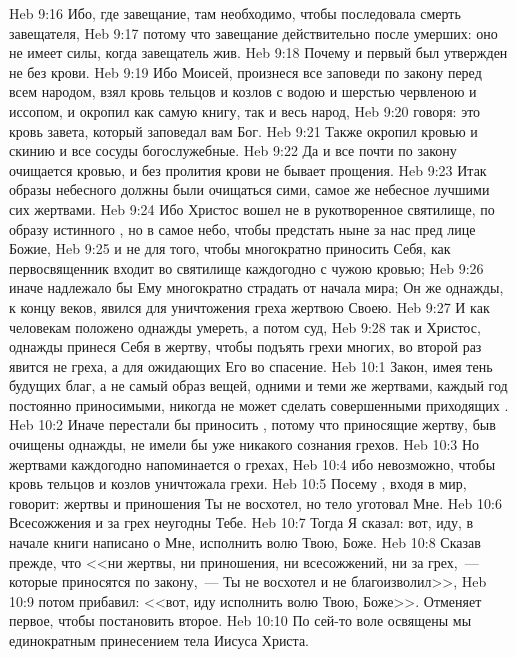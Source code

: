 \vs Heb 9:16 Ибо, где завещание, там необходимо, чтобы последовала смерть завещателя,
\vs Heb 9:17 потому что завещание действительно после умерших: оно не имеет силы, когда завещатель жив.
\vs Heb 9:18 Почему и первый  был утвержден не без крови.
\vs Heb 9:19 Ибо Моисей, произнеся все заповеди по закону перед всем народом, взял кровь тельцов и козлов с водою и шерстью червленою и иссопом, и окропил как самую книгу, так и весь народ,
\vs Heb 9:20 говоря: это кровь завета, который заповедал вам Бог.
\vs Heb 9:21 Также окропил кровью и скинию и все сосуды богослужебные.
\vs Heb 9:22 Да и все почти по закону очищается кровью, и без пролития крови не бывает прощения.
\rsbpar\vs Heb 9:23 Итак образы небесного должны были очищаться сими, самое же небесное лучшими сих жертвами.
\vs Heb 9:24 Ибо Христос вошел не в рукотворенное святилище, по образу истинного , но в самое небо, чтобы предстать ныне за нас пред лице Божие,
\vs Heb 9:25 и не для того, чтобы многократно приносить Себя, как первосвященник входит во святилище каждогодно с чужою кровью;
\vs Heb 9:26 иначе надлежало бы Ему многократно страдать от начала мира; Он же однажды, к концу веков, явился для уничтожения греха жертвою Своею.
\vs Heb 9:27 И как человекам положено однажды умереть, а потом суд,
\vs Heb 9:28 так и Христос, однажды принеся Себя в жертву, чтобы подъять грехи многих, во второй раз явится не  греха, а для ожидающих Его во спасение.
\vs Heb 10:1 Закон, имея тень будущих благ, а не самый образ вещей, одними и теми же жертвами, каждый год постоянно приносимыми, никогда не может сделать совершенными приходящих .
\vs Heb 10:2 Иначе перестали бы приносить , потому что приносящие жертву, быв очищены однажды, не имели бы уже никакого сознания грехов.
\vs Heb 10:3 Но жертвами каждогодно напоминается о грехах,
\vs Heb 10:4 ибо невозможно, чтобы кровь тельцов и козлов уничтожала грехи.
\vs Heb 10:5 Посему , входя в мир, говорит: жертвы и приношения Ты не восхотел, но тело уготовал Мне.
\vs Heb 10:6 Всесожжения и  за грех неугодны Тебе.
\vs Heb 10:7 Тогда Я сказал: вот, иду,  в начале книги написано о Мне, исполнить волю Твою, Боже.
\vs Heb 10:8 Сказав прежде, что <<ни жертвы, ни приношения, ни всесожжений, ни  за грех,~--- которые приносятся по закону,~--- Ты не восхотел и не благоизволил>>,
\vs Heb 10:9 потом прибавил: <<вот, иду исполнить волю Твою, Боже>>. Отменяет первое, чтобы постановить второе.
\vs Heb 10:10 По сей-то воле освящены мы единократным принесением тела Иисуса Христа.
